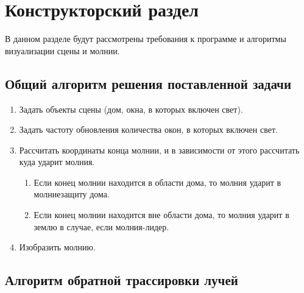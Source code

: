 \chapter{Конструкторский раздел}
В данном разделе будут рассмотрены требования к программе и алгоритмы визуализации сцены и молнии.




\section{Общий алгоритм решения поставленной задачи}
\begin{enumerate}
	\item Задать объекты сцены (дом, окна, в которых включен свет).
	\item Задать частоту обновления количества окон, в которых включен свет.
	\item Рассчитать координаты конца молнии, и в зависимости от этого рассчитать куда ударит молния.
	\begin{enumerate}
		\item Если конец молнии находится в области дома, то молния ударит в молниезащиту дома.
		\item Если конец молнии находится вне области дома, то молния ударит в землю в случае, если молния-лидер.
	\end{enumerate}
	\item Изобразить молнию.
\end{enumerate}


\section{Алгоритм обратной трассировки лучей}



